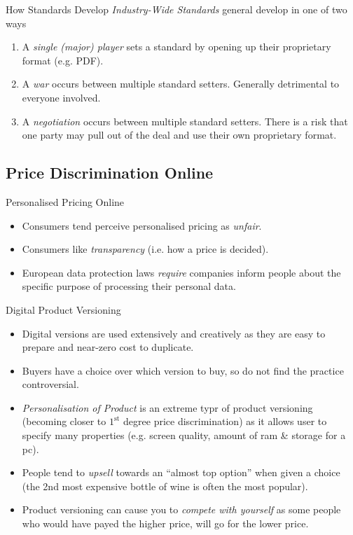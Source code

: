 \documentclass[11pt,a4paper]{article}
\begin{document}
  \begin{remark}{How Standards Develop}
    \textit{Industry-Wide Standards} general develop in one of two ways
    \begin{enumerate}
      \item A \textit{single (major) player} sets a standard by opening up their proprietary format (e.g. PDF).
      \item A \textit{war} occurs between multiple standard setters. Generally detrimental to everyone involved.
      \item A \textit{negotiation} occurs between multiple standard setters. There is a risk that one party may pull out of the deal and use their own proprietary format.
    \end{enumerate}
  \end{remark}

\subsection{Price Discrimination Online}

  \begin{remark}{Personalised Pricing Online}
    \begin{itemize}
      \item Consumers tend perceive personalised pricing as \textit{unfair}.
      \item Consumers like \textit{transparency} (i.e. how a price is decided).
      \item European data protection laws \textit{require} companies inform people about the specific purpose of processing their personal data.
    \end{itemize}
  \end{remark}

  \begin{proposition}{Digital Product Versioning}
    \begin{itemize}
      \item Digital versions are used extensively and creatively as they are easy to prepare and near-zero cost to duplicate.
      \item Buyers have a choice over which version to buy, so do not find the practice controversial.
      \item \textit{Personalisation of Product} is an extreme typr of product versioning (becoming closer to $1^\text{st}$ degree price discrimination) as it allows user to specify many properties (e.g. screen quality, amount of ram \& storage for a pc).
      \item People tend to \textit{upsell} towards an ``almost top option'' when given a choice (the 2nd most expensive bottle of wine is often the most popular).
      \item Product versioning can cause you to \textit{compete with yourself} as some people who would have payed the higher price, will go for the lower price.
    \end{itemize}
  \end{proposition}
\end{document}
